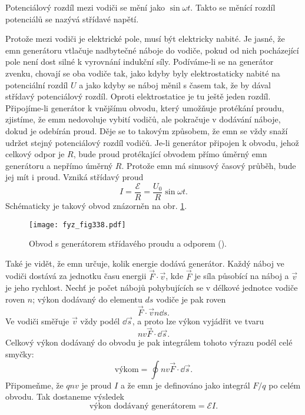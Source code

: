 {  Potenciálový rozdíl mezi vodiči se mění jako \(\sin\omega t\). Takto se měnící rozdíl potenciálů 
  se nazývá střídavé napětí.
  
  Protože mezi vodiči je elektrické pole, musí být elektricky nabité. Je jasné, že emn generátoru 
  vtlačuje nadbytečné náboje do vodiče, pokud od nich pocházející pole není dost silné k vyrovnání 
  indukční síly. Podíváme-li se na generátor zvenku, chovají se oba vodiče tak, jako kdyby byly 
  elektrostaticky nabité na potenciální rozdíl \(U\) a jako kdyby se náboj měnil s časem tak, že by 
  dával střídavý potenciálový rozdíl. Oproti elektrostatice je tu ještě jeden rozdíl. Připojíme-li 
  generátor  k vnějšímu obvodu, který umožňuje protékání proudu, zjistíme, že emm nedovoluje vybití 
  vodičů, ale pokračuje v dodávání náboje, dokud je odebírán proud. Děje se to takovým způsobem, že 
  emn se vždy snaží udržet stejný potenciálový rozdíl vodičů. Je-li generátor připojen k obvodu, 
  jehož celkový odpor je \(R\), bude proud protékající obvodem přímo úměrný emn generátoru a 
  nepřímo úměrný \(R\). Protože emn má sinusový časový průběh, bude jej mít i proud. Vzniká 
  střídavý proud
  \begin{equation}\label{fyz:eq393}
    I = \frac{\mathscr{E}}{R}= \frac{U_0}{R}\sin\omega t.
  \end{equation}
  Schématicky je takový obvod znázorněn na obr. \ref{fyz:fig338}.

  \begin{figure}[ht!]  %
    \centering
    \texttt{[image: fyz\_fig338.pdf]}
    \caption{Obvod s generátorem střídavého proudu a odporem 
             (\cite[s.~302]{Feynman02}).}
    \label{fyz:fig338}
  \end{figure}
  
  Také je vidět, že emn určuje, kolik energie dodává generátor. Každý náboj ve vodiči dostává za 
  jednotku času energii \(\vec{F}\cdot\vec{v}\), kde \(\vec{F}\) je síla působící na náboj a 
  \(\vec{v}\) je jeho rychlost. Nechť je počet nábojů pohybujících se v délkové jednotce vodiče 
  roven \(n\); výkon dodávaný do elementu \(ds\) vodiče je pak roven
  \begin{equation}\label{fyz:eq394}
    \vec{F}\cdot\vec{v}n\dd{s}.
  \end{equation}
  Ve vodiči směřuje \(\vec{v}\) vždy podél \(\dd{\vec{s}}\), a proto lze výkon vyjádřit ve tvaru
  \begin{equation}\label{fyz:eq395}
    nv\vec{F}\cdot\dd{\vec{s}}.
  \end{equation}
  Celkový výkon dodávaný do obvodu je pak integrálem tohoto výrazu podél celé smyčky:
  \begin{equation}\label{fyz:eq396}
    \text{výkom} = \oint nv\vec{F}\cdot\dd{\vec{s}}.
  \end{equation}
  Připomeňme, že \(qnv\) je proud \(I\) a že emn je definováno jako integrál \(F/q\) po celém 
  obvodu. Tak dostaneme výsledek 
  \begin{equation}\label{fyz:eq397}
    \text{výkon dodávaný generátorem} = \mathscr{E}I.
  \end{equation}
  
}
